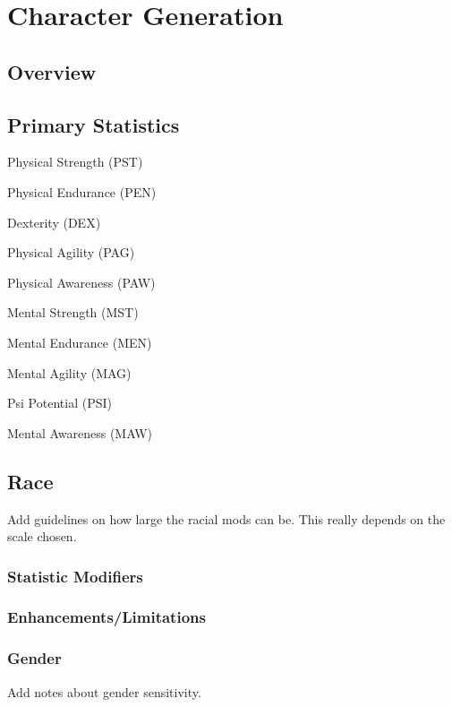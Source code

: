 \chapter{Character Generation}

\section{Overview}

\section{Primary Statistics}

\begin{relate}
	\item[Physical Strength	(PST)]
	\item[Physical Endurance (PEN)]
	\item[Dexterity	(DEX)]
	\item[Physical Agility (PAG)]
	\item[Physical Awareness (PAW)]
	\item[Mental Strength (MST)]
	\item[Mental Endurance (MEN)]
	\item[Mental Agility (MAG)]
	\item[Psi Potential (PSI)]
	\item[Mental Awareness (MAW)]
\end{relate}

\section{Race}

Add guidelines on how large the racial mods can be.
This really depends on the scale chosen.

\subsection{Statistic Modifiers}

\subsection{Enhancements/Limitations}

\subsection{Gender}

Add notes about gender sensitivity.

